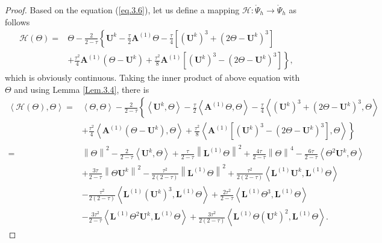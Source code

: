 \documentclass{siamart171218}
\numberwithin{theorem}{section}
\numberwithin{equation}{section}
\begin{document}
\begin{proof}
Based on the equation (\ref{eq.3.6}),
let us define a mapping $\mathcal{H} : \mathring{\Psi}_h\rightarrow \mathring{\Psi}_h$
as follows
\begin{equation*}
\begin{aligned}\displaystyle
\mathcal{H} \left(\Theta\right)=&\Theta-\frac{2}{2-\tau}
\left\{\mathbf{U}^{k}-\frac{\tau}{2}\mathbf{A}^{(1)}\Theta
-\frac{\tau}{4}\left[\left(\mathbf{U}^{k}\right)^3+\left(2\Theta-\mathbf{U}^{k}\right)^3\right]
\right.\\
&+\frac{\tau^2}{4}\mathbf{A}^{(1)}\left(\Theta-\mathbf{U}^{k}\right)+\left.
\frac{\tau^2}{8}\mathbf{A}^{(1)}
\left[\left(\mathbf{U}^{k}\right)^3-\left(2\Theta-\mathbf{U}^{k}\right)^3\right]
\right\},
\end{aligned}
\end{equation*}
which is obviously continuous. Taking the inner product of above equation with $\Theta$
 and using Lemma \ref{Lem.3.4},  there is
\begin{equation*}
\begin{aligned}\displaystyle
\left\langle\mathcal{H} \left(\Theta\right),\Theta\right\rangle
=&\left\langle\Theta,\Theta\right\rangle-\frac{2}{2-\tau}
\left\{\left\langle\mathbf{U}^{k},\Theta\right\rangle-
\frac{\tau}{2}\left\langle\mathbf{A}^{(1)}\Theta,\Theta\right\rangle
-\frac{\tau}{4}\left\langle\left(\mathbf{U}^{k}\right)^3
+\left(2\Theta-\mathbf{U}^{k}\right)^3
,\Theta\right\rangle
\right.\\
&+\frac{\tau^2}{4}\left\langle\mathbf{A}^{(1)}\left(\Theta-\mathbf{U}^{k}\right),\Theta\right\rangle+\left.
\frac{\tau^2}{8}\left\langle\mathbf{A}^{(1)}
\left[\left(\mathbf{U}^{k}\right)^3-\left(2\Theta-\mathbf{U}^{k}\right)^3\right],\Theta\right\rangle
\right\}\\
=&\left\|\Theta\right\|^2-\frac{2}{2-\tau}
\left\langle\mathbf{U}^{k},\Theta\right\rangle+\frac{\tau}{2-\tau}\left\|\mathbf{L}^{(1)}\Theta\right\|^2
+\frac{4\tau}{2-\tau}\left\|\Theta\right\|^4
-\frac{6\tau}{2-\tau}\left\langle\Theta^2\mathbf{U}^{k},\Theta\right\rangle\\
&+\frac{3\tau}{2-\tau}\left\|\Theta\mathbf{U}^{k}\right\|^2
-\frac{\tau^2}{2(2-\tau)}\left\|\mathbf{L}^{(1)}\Theta\right\|^2
+\frac{\tau^2}{2(2-\tau)}\left\langle\mathbf{L}^{(1)}\mathbf{U}^{k},\mathbf{L}^{(1)}\Theta\right\rangle\\
&-\frac{\tau^2}{2(2-\tau)}\left\langle\mathbf{L}^{(1)}\left(\mathbf{U}^{k}\right)^3,\mathbf{L}^{(1)}
\Theta\right\rangle
+\frac{2\tau^2}{2-\tau}\left\langle\mathbf{L}^{(1)}\Theta^3,\mathbf{L}^{(1)}\Theta\right\rangle\\
&-\frac{3\tau^2}{2-\tau}\left\langle\mathbf{L}^{(1)}\Theta^2\mathbf{U}^{k},\mathbf{L}^{(1)}
\Theta\right\rangle
+\frac{3\tau^2}{2(2-\tau)}\left\langle\mathbf{L}^{(1)}
\Theta\left(\mathbf{U}^{k}\right)^2,
\mathbf{L}^{(1)}\Theta\right\rangle.
\end{aligned}
\end{equation*}


\end{proof}
\end{document}
